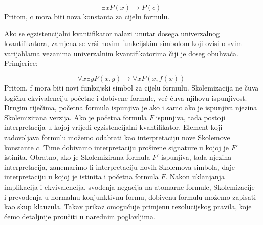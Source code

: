 \documentclass{article}
\theoremstyle{definition}
\theoremstyle{plain}
\begin{document}
\[
\exists xP(x) \rightarrow
P(c)
\]\newline
Pritom, c mora biti nova konstanta za cijelu formulu.

Ako se egzistencijalni kvantifikator nalazi unutar dosega univerzalnog kvantifikatora, zamjena se vrši novim funkcijskim simbolom koji ovisi o svim varijablama vezanima univerzalnim kvantifikatorima čiji je doseg obuhvaća.
Primjerice:

\[
\forall x\exists yP(x,y) \rightarrow
\forall xP(x,f(x))
\]
Pritom, f mora biti novi funkcijski simbol za cijelu formulu.
Skolemizacija ne čuva logičku ekvivalenciju početne i dobivene formule, već čuva njihovu ispunjivost. Drugim riječima, početna formula ispunjiva je ako i samo ako je ispunjiva njezina Skolemizirana verzija. Ako je početna formula \(F\) ispunjiva, tada postoji interpretacija u kojoj vrijedi egzistencijalni kvantifikator. Element koji zadovoljava formulu možemo odabrati kao interpretaciju nove Skolemove konstante \(c\). Time dobivamo interpretaciju proširene signature u kojoj je \(F'\) istinita. Obratno, ako je Skolemizirana formula \(F'\) ispunjiva, tada njezina interpretacija, zanemarimo li interpretaciju novih Skolemova simbola, daje interpretaciju u kojoj je istinita i početna formula \(F\). Nakon uklanjanja implikacija i ekvivalencija, svođenja negacija na atomarne formule, Skolemizacije i prevođenja u normalnu konjunktivnu formu, dobivenu formulu možemo zapisati kao skup klauzula. Takav prikaz omogućuje primjenu rezolucijskog pravila, koje ćemo detaljnije proučiti u narednim poglavljima.
\end{document}
